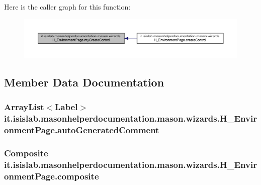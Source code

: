 Here is the caller graph for this function\-:
\nopagebreak
\begin{figure}[H]
\begin{center}
\leavevmode
\includegraphics[width=350pt]{classit_1_1isislab_1_1masonhelperdocumentation_1_1mason_1_1wizards_1_1_h___environment_page_a09a8404f1e96b68ec8bcb29a3da65558_icgraph}
\end{center}
\end{figure}




\subsection{Member Data Documentation}
\hypertarget{classit_1_1isislab_1_1masonhelperdocumentation_1_1mason_1_1wizards_1_1_h___environment_page_a5495002868c1d72f31f79a3e584fdd60}{
\subsubsection[{auto\-Generated\-Comment}]{\setlength{\rightskip}{0pt plus 5cm}Array\-List$<$Label$>$ it.\-isislab.\-masonhelperdocumentation.\-mason.\-wizards.\-H\-\_\-\-Environment\-Page.\-auto\-Generated\-Comment\hspace{0.3cm}{\ttfamily [private]}}}\label{classit_1_1isislab_1_1masonhelperdocumentation_1_1mason_1_1wizards_1_1_h___environment_page_a5495002868c1d72f31f79a3e584fdd60}
\hypertarget{classit_1_1isislab_1_1masonhelperdocumentation_1_1mason_1_1wizards_1_1_h___environment_page_acd16b35445be03e0527a45d03cf61573}{
\subsubsection[{composite}]{\setlength{\rightskip}{0pt plus 5cm}Composite it.\-isislab.\-masonhelperdocumentation.\-mason.\-wizards.\-H\-\_\-\-Environment\-Page.\-composite\hspace{0.3cm}{\ttfamily [private]}}}\label{classit_1_1isislab_1_1masonhelperdocumentation_1_1mason_1_1wizards_1_1_h___environment_page_acd16b35445be03e0527a45d03cf61573}
